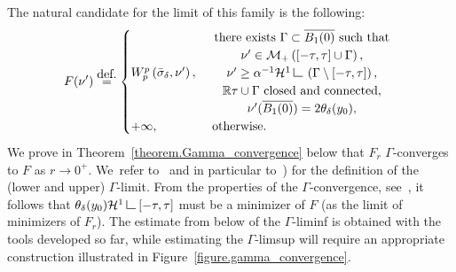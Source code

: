 \documentclass[11pt]{article}
\numberwithin{equation}{section}
\theoremstyle{definition}
\newcommand{\eqdef}{\ensuremath{\stackrel{\mbox{\upshape\tiny def.}}{=}}}
\newcommand\LM[1]{\hbox{\vrule width.5pt \vbox to#1pt{\vfill \hrule width#1pt height.5pt}}}
\newcommand\LL{{\mathchoice {\>\LM7\>}{\>\LM7\>}{\,\LM5\,}{\,\LM{3.35}\,}}}
\newcommand{\mres}{\LL}
\newcommand\cH{\mathcal{H}}
\newcommand{\RR}{\mathbb{R}}
\begin{document}
The natural candidate for the limit of this family is the following:
\begin{equation}\label{Gamma_limitF}
F(\nu') \eqdef
\begin{cases}
W_p^p\left( \bar \sigma_{\delta}, \nu' \right),&
\begin{array}{c}
\text{there exists $\Gamma \subset \overline{B_1(0)}$ such that}\\
\nu' \in \mathcal{M}_+\left([-\tau, \tau] \cup \Gamma\right),
\\ \nu' \ge \alpha^{-1}\cH^1\mres \left(\Gamma\setminus[-\tau,\tau]\right),\\
\RR\tau \cup \Gamma \text{ closed and connected},\\ \nu'(\overline{B_1(0)}) = 2\theta_\delta(y_0),
\end{array} \\
+\infty,& \text{ otherwise.}
\end{cases}
\end{equation}
We prove in Theorem~\ref{theorem.Gamma_convergence} below that $F_r$ $\Gamma$-converges to $F$ as $r\to 0^+$. We~refer to~\cite{dal_maso_introduction_1993,braides_gamma-convergence_2002} and in particular to~\cite[Def.\,1.24]{braides_gamma-convergence_2002}) for the definition of the (lower and upper) $\Gamma$-limit. From the properties of the $\Gamma$-convergence, see~\cite[Cor.\,7.20]{dal_maso_introduction_1993}, it follows that $\theta_\delta(y_0)\cH^1\mres [-\tau, \tau]$ must be a minimizer of $F$ (as the limit of minimizers of $F_r$). The estimate from below of the $\Gamma$-liminf is obtained with the tools developed so far, while estimating the $\Gamma$-limsup will require an appropriate construction illustrated in Figure~\ref{figure.gamma_convergence}.
\end{document}
